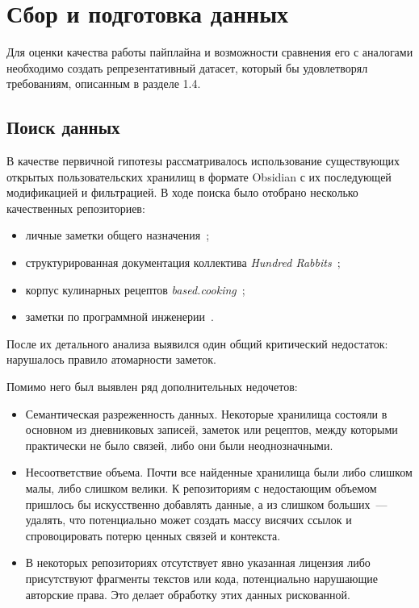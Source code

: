 \clearpage
\section{Сбор и подготовка данных}

Для оценки качества работы пайплайна и возможности
сравнения его с аналогами необходимо создать репрезентативный датасет,
который бы удовлетворял требованиям, описанным в разделе 1.4.

\subsection{Поиск данных}

В качестве первичной гипотезы рассматривалось использование существующих открытых
пользовательских хранилищ в формате Obsidian с их последующей модификацией и фильтрацией.
В ходе поиска было отобрано несколько качественных репозиториев:
\begin{itemize}
      \item личные заметки общего назначения~\cite{noodleslove_notes};
      \item структурированная документация коллектива \textit{Hundred Rabbits}~\cite{100r_co};
      \item корпус кулинарных рецептов \textit{based.cooking}~\cite{based_cooking};
      \item заметки по программной инженерии~\cite{keyvanakbary_notes}.
\end{itemize}

После их детального анализа выявился один общий критический недостаток:
нарушалось правило атомарности заметок.

Помимо него был выявлен ряд дополнительных недочетов:
\begin{itemize}
      \item Семантическая разреженность данных.
            Некоторые хранилища состояли в основном из дневниковых записей, заметок или рецептов,
            между которыми практически не было связей, либо они были неоднозначными.
      \item Несоответствие объема.
            Почти все найденные хранилища были либо слишком малы, либо слишком велики.
            К репозиториям с недостающим объемом пришлось бы искусственно добавлять данные, а из
            слишком больших~--- удалять,
            что потенциально может создать массу висячих ссылок и
            спровоцировать потерю ценных связей и контекста.
      \item В некоторых репозиториях отсутствует явно указанная лицензия
            либо присутствуют фрагменты текстов или кода,
            потенциально нарушающие авторские права.
            Это делает обработку этих данных рискованной.
\end{itemize}


